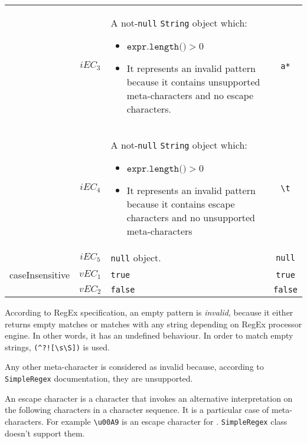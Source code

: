 \documentclass[sigconf]{acmart}
\begin{document}
\begin{table*}
\begin{threeparttable}[b]
\begin{tabular}{l|cm{10.5cm}|c}
\\\cline{2-4}

& $iEC_3$ & A not-\texttt{null} \texttt{String} object which: 

 \begin{itemize}
\item $\texttt{expr.length()} > 0$
\item It represents an invalid pattern because it contains unsupported meta-characters and no escape characters.
\end{itemize}

& \texttt{a*}

\\\cline{2-4}

& $iEC_4$ & A not-\texttt{null} \texttt{String} object which: 

 \begin{itemize}
\item $\texttt{expr.length()} > 0$
\item It represents an invalid pattern because it contains escape characters and no unsupported meta-characters
\end{itemize}

& \texttt{\textbackslash t}

\\\cline{2-4}

& $iEC_5$ & \texttt{null} object. & \texttt{null}

\\\hline

caseInsensitive & $vEC_1$ & \texttt{true} & \texttt{true}

\\\cline{2-4}

& $vEC_2$ & \texttt{false} & \texttt{false}

\\

\bottomrule
\end{tabular}
   \begin{tablenotes}
     \item[1] According to RegEx specification, an empty pattern is \textit{invalid}, because it either returns empty matches or matches with any string depending on RegEx processor engine. In other words, it has an undefined behaviour. In order to match empty strings, \texttt{(\^{}?![\textbackslash s\textbackslash S])} is used.
     \item[2] Any other meta-character is considered as invalid because, according to \texttt{SimpleRegex} documentation, they are unsupported.
     \item[3] An escape character is a character that invokes an alternative interpretation on the following characters in a character sequence. It is a particular case of meta-characters. For example \verb|\u00A9| is an escape character for \textsuperscript{\textcopyright}. \texttt{SimpleRegex} class doesn't support them.
   \end{tablenotes}
  \end{threeparttable}
\end{table*}
\end{document}
